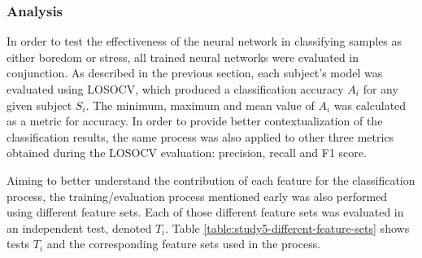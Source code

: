 \subsubsection{Analysis}
\label{s:experiment1-study5-analysis}

In order to test the effectiveness of the neural network in classifying samples as either boredom or stress, all trained neural networks were evaluated in conjunction. As described in the previous section, each subject's model was evaluated using LOSOCV, which produced a classification accuracy $A_i$ for any given subject $S_i$. The minimum, maximum and mean value of $A_i$ was calculated as a metric for accuracy. In order to provide better contextualization of the classification results, the same process was also applied to other three metrics obtained during the LOSOCV evaluation: precision, recall and F1 score.

Aiming to better understand the contribution of each feature for the classification process, the training/evaluation process mentioned early was also performed using different feature sets. Each of those different feature sets was evaluated in an independent test, denoted $T_i$. Table \ref{table:study5-different-feature-sets} shows tests $T_i$ and the corresponding feature sets used in the process.


